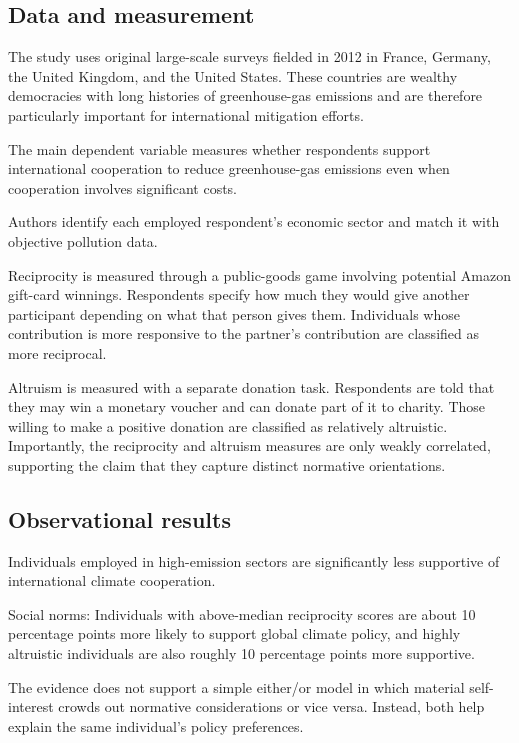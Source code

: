 \subsection{Data and measurement}

The study uses original large-scale surveys fielded in 2012 in France, Germany, the United Kingdom, and the United States. These countries are wealthy democracies with long histories of greenhouse-gas emissions and are therefore particularly important for international mitigation efforts.

The main dependent variable measures whether respondents support international cooperation to reduce greenhouse-gas emissions even when cooperation involves significant costs.

Authors identify each employed respondent's economic sector and match it with objective pollution data.

Reciprocity is measured through a public-goods game involving potential Amazon gift-card winnings. Respondents specify how much they would give another participant depending on what that person gives them. Individuals whose contribution is more responsive to the partner's contribution are classified as more reciprocal.

Altruism is measured with a separate donation task. Respondents are told that they may win a monetary voucher and can donate part of it to charity. Those willing to make a positive donation are classified as relatively altruistic. Importantly, the reciprocity and altruism measures are only weakly correlated, supporting the claim that they capture distinct normative orientations.

\subsection{Observational results}

Individuals employed in high-emission sectors are significantly less supportive of international climate cooperation.

Social norms: Individuals with above-median reciprocity scores are about 10 percentage points more likely to support global climate policy, and highly altruistic individuals are also roughly 10 percentage points more supportive.

The evidence does not support a simple either/or model in which material self-interest crowds out normative considerations or vice versa. Instead, both help explain the same individual's policy preferences.

